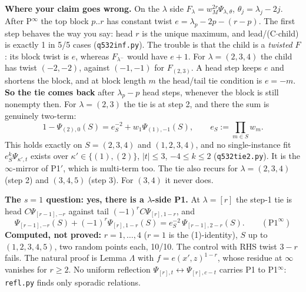 \documentclass[10pt]{article}
\begin{document}
\textbf{Where your claim goes wrong.} On the $\lambda$ side $F_\lambda=w_M^{2r}\Psi_{\lambda,\theta}$, $\theta_j=\lambda_j-2j$. After P$^\infty$ the top block $p..r$ has
constant twist $e=\lambda_p-2p-(r-p)$. The first step behaves the way you say: head $r$ is the unique maximum, and lead/(C$\cdot$child) is exactly 1 in 5/5 cases (\texttt{q532inf.py}).
The trouble is that the child is a \emph{twisted} $F$: its block twist is $e$, whereas $F_{\lambda^-}$ would have $e+1$. For $\lambda=(2,3,4)$ the child has twist $(-2,-2)$, against $(-1,-1)$ for $F_{(2,3)}$.
A head step keeps $e$ and shortens the block, and at block length $m$ the head/tail tie condition is $e=-m$. \textbf{So the tie comes back} after $\lambda_p-p$ head steps,
whenever the block is still nonempty then. For $\lambda=(2,3)$ the tie is at step 2, and there the sum is genuinely two-term:
\[
1-\Psi_{(2),0}(S)=e_S^{-2}+w_1\Psi_{(1),-1}(S),\qquad e_S:=\textstyle\prod_{m\in S}w_m .
\]
This holds exactly on $S=(2,3,4)$ and $(1,2,3,4)$, and no single-instance fit $e_S^k\Psi_{\kappa',t}$ exists over $\kappa'\in\{(1),(2)\}$, $|t|\le3$, $-4\le k\le2$ (\texttt{q532tie2.py}).
It is the $\infty$-mirror of P1$'$, which is multi-term too. The tie also recurs for $\lambda=(2,3,4)$ (step 2) and $(3,4,5)$ (step 3). For $(3,4)$ it never does.

\textbf{The $s=1$ question: yes, there is a $\lambda$-side P1.} At $\lambda=[r]$ the step-1 tie is head $C\Psi_{[r-1],-r}$ against tail $(-1)^rC\Psi_{[r],1-r}$, and
\[
\Psi_{[r-1],-r}(S)+(-1)^r\Psi_{[r],1-r}(S)=e_S^{-2}\,\Psi_{[r-1],2-r}(S).\qquad(\mathrm{P1}^\infty)
\]
\textbf{Computed, not proved:} $r=1,\dots,4$ ($r=1$ is the (1)-identity), $S$ up to $(1,2,3,4,5)$, two random points each, 10/10. The control with RHS twist $3-r$ fails.
The natural proof is Lemma $\Lambda$ with $f=e(x',z)^{1-r}$, whose residue at $\infty$ vanishes for $r\ge2$. No uniform reflection $\Psi_{[r],t}\leftrightarrow\Psi_{[r],c-t}$ carries P1 to P1$^\infty$:
\texttt{refl.py} finds only sporadic relations.
\end{document}
